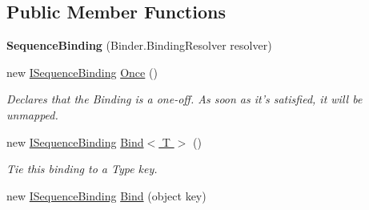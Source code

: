 \subsection*{Public Member Functions}
\begin{DoxyCompactItemize}
\item 
\hypertarget{classstrange_1_1extensions_1_1sequencer_1_1impl_1_1_sequence_binding_aa78a28ba46eba07658cb34a13e45419a}{{\bfseries Sequence\-Binding} (Binder.\-Binding\-Resolver resolver)}\label{classstrange_1_1extensions_1_1sequencer_1_1impl_1_1_sequence_binding_aa78a28ba46eba07658cb34a13e45419a}

\item 
\hypertarget{classstrange_1_1extensions_1_1sequencer_1_1impl_1_1_sequence_binding_a073ca25f3860ecf53b90fbf44a7cd679}{new \hyperlink{interfacestrange_1_1extensions_1_1sequencer_1_1api_1_1_i_sequence_binding}{I\-Sequence\-Binding} \hyperlink{classstrange_1_1extensions_1_1sequencer_1_1impl_1_1_sequence_binding_a073ca25f3860ecf53b90fbf44a7cd679}{Once} ()}\label{classstrange_1_1extensions_1_1sequencer_1_1impl_1_1_sequence_binding_a073ca25f3860ecf53b90fbf44a7cd679}

\begin{DoxyCompactList}\small\item\em Declares that the Binding is a one-\/off. As soon as it's satisfied, it will be unmapped. \end{DoxyCompactList}\item 
\hypertarget{classstrange_1_1extensions_1_1sequencer_1_1impl_1_1_sequence_binding_a0aa1146feb6da03085a51bea2d9ea54e}{new \hyperlink{interfacestrange_1_1extensions_1_1sequencer_1_1api_1_1_i_sequence_binding}{I\-Sequence\-Binding} \hyperlink{classstrange_1_1extensions_1_1sequencer_1_1impl_1_1_sequence_binding_a0aa1146feb6da03085a51bea2d9ea54e}{Bind$<$ T $>$} ()}\label{classstrange_1_1extensions_1_1sequencer_1_1impl_1_1_sequence_binding_a0aa1146feb6da03085a51bea2d9ea54e}

\begin{DoxyCompactList}\small\item\em Tie this binding to a Type key. \end{DoxyCompactList}\item 
\hypertarget{classstrange_1_1extensions_1_1sequencer_1_1impl_1_1_sequence_binding_a21daba07eec62b0e40cfe1b525cf3253}{new \hyperlink{interfacestrange_1_1extensions_1_1sequencer_1_1api_1_1_i_sequence_binding}{I\-Sequence\-Binding} \hyperlink{classstrange_1_1extensions_1_1sequencer_1_1impl_1_1_sequence_binding_a21daba07eec62b0e40cfe1b525cf3253}{Bind} (object key)}\label{classstrange_1_1extensions_1_1sequencer_1_1impl_1_1_sequence_binding_a21daba07eec62b0e40cfe1b525cf3253}


\end{DoxyCompactItemize}
